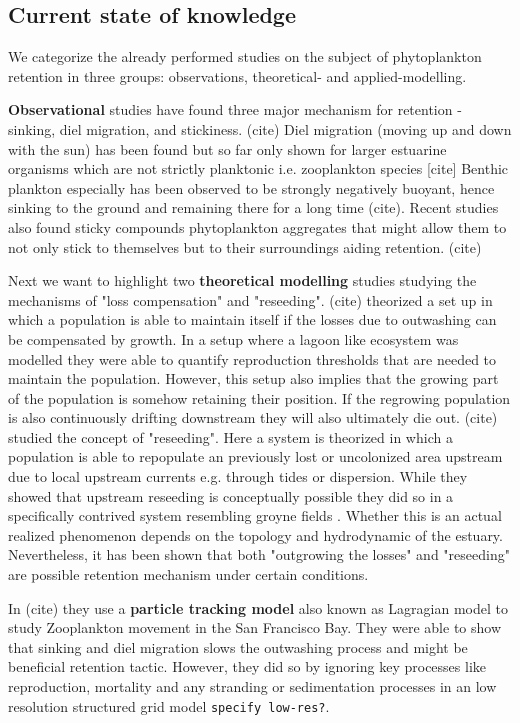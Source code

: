 \subsection*{Current state of knowledge}


We categorize the already performed studies on the subject of phytoplankton retention in three groups: observations, theoretical- and applied-modelling.

\textbf{Observational} studies have found three major mechanism for retention - sinking, diel migration, and stickiness. (cite)
Diel migration (moving up and down with the sun) has been found but so far only shown for larger estuarine organisms which are not strictly planktonic i.e. zooplankton species [cite]
Benthic plankton especially has been observed to be strongly negatively buoyant, hence sinking to the ground and remaining there for a long time (cite).
Recent studies also found sticky compounds phytoplankton aggregates that might allow them to not only stick to themselves but to their surroundings aiding retention. (cite)

Next we want to highlight two \textbf{theoretical modelling} studies studying the mechanisms of "loss compensation" and "reseeding".
(cite) theorized a set up in which a population is able to maintain itself if the losses due to outwashing can be compensated by growth.
In a setup where a lagoon like ecosystem was modelled they were able to quantify reproduction thresholds that are needed to maintain the population.
However, this setup also implies that the growing part of the population is somehow retaining their position.
If the regrowing population is also continuously drifting downstream they will also ultimately die out.
(cite) studied the concept of "reseeding".
Here a system is theorized in which a population is able to repopulate an previously 
lost or uncolonized area upstream due to local upstream currents e.g. through tides or dispersion.
While they showed that upstream reseeding is conceptually possible they did so in a specifically contrived system resembling groyne fields .
Whether this is an actual realized phenomenon depends on the topology and hydrodynamic of the estuary.
Nevertheless, it has been shown that both "outgrowing the losses" and "reseeding" are possible retention mechanism under certain conditions.

In (cite) they use a \textbf{particle tracking model} also known as Lagragian model to study Zooplankton movement in the San Francisco Bay.
They were able to show  that sinking and diel migration slows the outwashing process and might be beneficial retention tactic.
However, they did so by ignoring key processes like reproduction, mortality and any stranding or sedimentation processes in an low resolution structured grid model \texttt{specify low-res?}.


